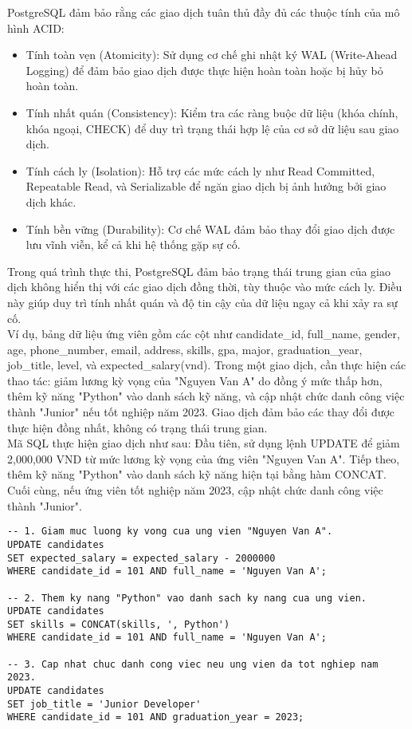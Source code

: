 PostgreSQL đảm bảo rằng các giao dịch tuân thủ đầy đủ các thuộc tính của mô hình ACID:
\begin{itemize}
    \item Tính toàn vẹn (Atomicity): Sử dụng cơ chế ghi nhật ký WAL (Write-Ahead Logging) để đảm bảo giao dịch được thực hiện hoàn toàn hoặc bị hủy bỏ hoàn toàn.
    \item Tính nhất quán (Consistency): Kiểm tra các ràng buộc dữ liệu (khóa chính, khóa ngoại, CHECK) để duy trì trạng thái hợp lệ của cơ sở dữ liệu sau giao dịch.
    \item Tính cách ly (Isolation): Hỗ trợ các mức cách ly như Read Committed, Repeatable Read, và Serializable để ngăn giao dịch bị ảnh hưởng bởi giao dịch khác.
    \item Tính bền vững (Durability): Cơ chế WAL đảm bảo thay đổi giao dịch được lưu vĩnh viễn, kể cả khi hệ thống gặp sự cố.
\end{itemize}

Trong quá trình thực thi, PostgreSQL đảm bảo trạng thái trung gian của giao dịch không hiển thị với các giao dịch đồng thời, tùy thuộc vào mức cách ly. Điều này giúp duy trì tính nhất quán và độ tin cậy của dữ liệu ngay cả khi xảy ra sự cố.\\

Ví dụ, bảng dữ liệu ứng viên gồm các cột như candidate\_id, full\_name, gender, age, phone\_number, email, address, skills, gpa, major, graduation\_year, job\_title, level, và expected\_salary(vnd). Trong một giao dịch, cần thực hiện các thao tác: giảm lương kỳ vọng của "Nguyen Van A" do đồng ý mức thấp hơn, thêm kỹ năng "Python" vào danh sách kỹ năng, và cập nhật chức danh công việc thành "Junior" nếu tốt nghiệp năm 2023. Giao dịch đảm bảo các thay đổi được thực hiện đồng nhất, không có trạng thái trung gian.\\

Mã SQL thực hiện giao dịch như sau: Đầu tiên, sử dụng lệnh UPDATE để giảm 2,000,000 VND từ mức lương kỳ vọng của ứng viên "Nguyen Van A". Tiếp theo, thêm kỹ năng "Python" vào danh sách kỹ năng hiện tại bằng hàm CONCAT. Cuối cùng, nếu ứng viên tốt nghiệp năm 2023, cập nhật chức danh công việc thành "Junior".
\begin{lstlisting}
-- 1. Giam muc luong ky vong cua ung vien "Nguyen Van A".
UPDATE candidates 
SET expected_salary = expected_salary - 2000000
WHERE candidate_id = 101 AND full_name = 'Nguyen Van A';

-- 2. Them ky nang "Python" vao danh sach ky nang cua ung vien.
UPDATE candidates 
SET skills = CONCAT(skills, ', Python')
WHERE candidate_id = 101 AND full_name = 'Nguyen Van A';

-- 3. Cap nhat chuc danh cong viec neu ung vien da tot nghiep nam 2023.
UPDATE candidates 
SET job_title = 'Junior Developer'
WHERE candidate_id = 101 AND graduation_year = 2023;
\end{lstlisting}

